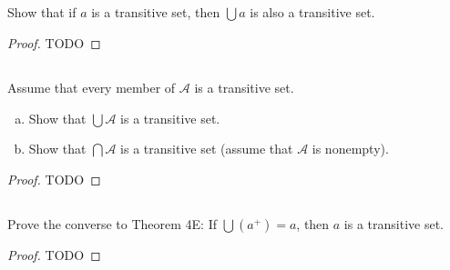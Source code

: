 \documentclass{report}
\begin{document}
\subsection{}%

Show that if $a$ is a transitive set, then $\bigcup a$ is also a transitive set.

\begin{proof}

  TODO

\end{proof}

\subsection{}%

Assume that every member of $\mathscr{A}$ is a transitive set.

\begin{enumerate}[(a)]
  \item Show that $\bigcup \mathscr{A}$ is a transitive set.
  \item Show that $\bigcap \mathscr{A}$ is a transitive set (assume that
    $\mathscr{A}$ is nonempty).
\end{enumerate}

\begin{proof}

  TODO

\end{proof}

\subsection{}%

Prove the converse to Theorem 4E: If $\bigcup \left(a^+\right) = a$, then $a$ is
  a transitive set.

\begin{proof}

  TODO

\end{proof}
\end{document}
